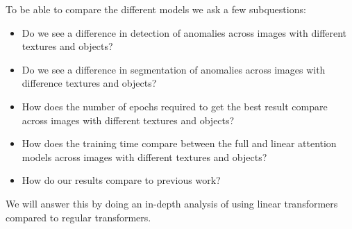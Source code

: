 To be able to compare the different models we ask a few subquestions:
\begin{itemize}
    \item Do we see a difference in detection of anomalies across images with different textures and objects?
    \item Do we see a difference in segmentation of anomalies across images with difference textures and objects?
    \item How does the number of epochs required to get the best result compare across images with different textures and objects?
    \item How does the training time compare between the full and linear attention models across images with different textures and objects?
    \item How do our results compare to previous work?
\end{itemize}

We will answer this by doing an in-depth analysis of using linear transformers compared to regular transformers.

